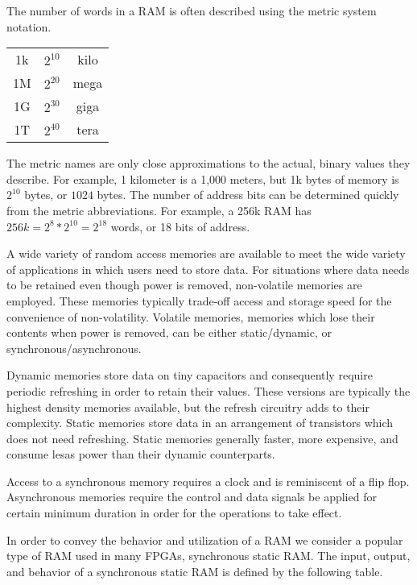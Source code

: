The number of words in a RAM is often described using the metric system notation.

\begin{tabular}{ccc}
1k & $2^{10}$ & kilo \\ 
1M & $2^{20}$ & mega \\ 
1G & $2^{30}$ & giga \\ 
1T & $2^{40}$ & tera \\ 
\end{tabular}

The metric names are only close approximations to the actual, binary values
they describe.  For example, 1 kilometer is a 1,000 meters, but 
1k bytes of memory is $2^{10}$ bytes, or $1024$ bytes.  The number of 
address bits can be determined quickly from the metric abbreviations.
For example, a 256k RAM has $256k=2^8*2^{10}=2^{18}$ words, or 18 bits 
of address.

A wide variety of random access memories are available to meet the wide
variety of applications in which users need to store data.  For situations where
data needs to be retained even though power is removed, non-volatile memories are employed.  
These memories typically trade-off access and storage speed for the 
convenience of non-volatility.  Volatile memories, memories which lose
their contents when power is removed, can be either static/dynamic, or 
synchronous/asynchronous.  

Dynamic memories store data on tiny capacitors and
consequently require periodic refreshing in order to retain their values.  These versions
are typically the highest density memories available, but the refresh circuitry
adds to their complexity.  Static memories store data in an arrangement
of transistors which does not need refreshing.  Static memories generally 
faster, more expensive, and consume lesas power than their dynamic counterparts.  

Access to a synchronous memory requires a clock and is reminiscent of a flip flop.
Asynchronous memories require the control and data signals be applied
for certain minimum duration in order for the operations to take effect.

In order to convey the behavior and utilization of a RAM we consider a popular
type of RAM used in many FPGAs, synchronous static RAM.
The input, output, and behavior of a synchronous static RAM is defined by the following table.

